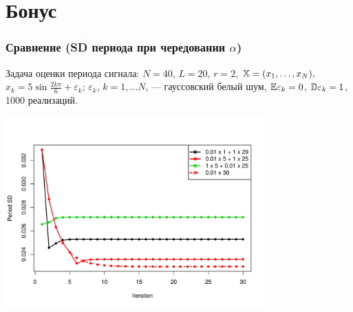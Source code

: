 \documentclass[unicode, notheorems]{beamer}
\begin{document}
\section{Бонус}

\begin{frame}
	\frametitle{Сравнение (SD периода при чередовании $\alpha$)}
	Задача оценки периода сигнала: $N = 40$, $L = 20$, $r = 2$, $\mathbb{X} = (x_{1}, \ldots, x_N),$  $x_k = 5\sin{\frac{2 k \pi}{6}} + \varepsilon_k$; $\varepsilon_k$, $k = 1, \ldots N$, --- гауссовский белый шум, $\mathbb{E} \varepsilon_k = 0$, $\mathbb{D} \varepsilon_k = 1$, 1000 реализаций.
	
	\vspace{-1cm}
	\begin{center}
		\includegraphics*[width = 10cm]{esprit.pdf}
	\end{center}
\end{frame}


\end{document}
